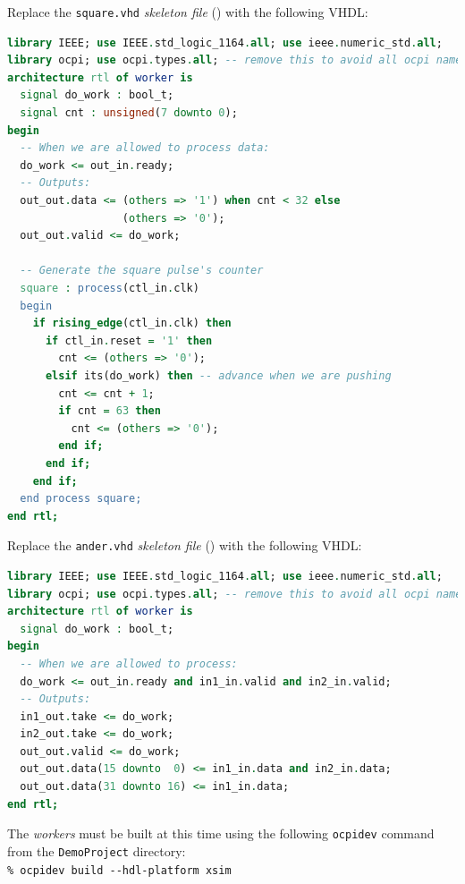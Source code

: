 \bend
\bstart
Replace the \verb+square.vhd+ \textit{skeleton file} () with the following VHDL:
\begin{lstlisting}[language=vhdl, columns=fullflexible, breaklines=true, prebreak=\textbackslash, basicstyle=\ttfamily, showstringspaces=false, upquote=true]
library IEEE; use IEEE.std_logic_1164.all; use ieee.numeric_std.all;
library ocpi; use ocpi.types.all; -- remove this to avoid all ocpi name collisions
architecture rtl of worker is
  signal do_work : bool_t;
  signal cnt : unsigned(7 downto 0);
begin
  -- When we are allowed to process data:
  do_work <= out_in.ready;
  -- Outputs:
  out_out.data <= (others => '1') when cnt < 32 else
                  (others => '0');
  out_out.valid <= do_work;

  -- Generate the square pulse's counter
  square : process(ctl_in.clk)
  begin
    if rising_edge(ctl_in.clk) then
      if ctl_in.reset = '1' then
        cnt <= (others => '0');
      elsif its(do_work) then -- advance when we are pushing
        cnt <= cnt + 1;
        if cnt = 63 then
          cnt <= (others => '0');
        end if;
      end if;
    end if;
  end process square;
end rtl;
\end{lstlisting}
\bend

\bstart
Replace the \verb+ander.vhd+ \textit{skeleton file}  () with the following VHDL:

\begin{lstlisting}[language=vhdl, columns=fullflexible, breaklines=true, prebreak=\textbackslash, basicstyle=\ttfamily, showstringspaces=false, upquote=true]
library IEEE; use IEEE.std_logic_1164.all; use ieee.numeric_std.all;
library ocpi; use ocpi.types.all; -- remove this to avoid all ocpi name collisions
architecture rtl of worker is
  signal do_work : bool_t;
begin
  -- When we are allowed to process:
  do_work <= out_in.ready and in1_in.valid and in2_in.valid;
  -- Outputs:
  in1_out.take <= do_work;
  in2_out.take <= do_work;
  out_out.valid <= do_work;
  out_out.data(15 downto  0) <= in1_in.data and in2_in.data;
  out_out.data(31 downto 16) <= in1_in.data;
end rtl;
\end{lstlisting}
\bend
\label{example:buildworkers}
The \textit{workers} must be built at this time using the following \verb+ocpidev+ command from the \verb+DemoProject+ directory:\\

\forceindent\verb+% ocpidev build --hdl-platform xsim+
\OcpidevBuild

